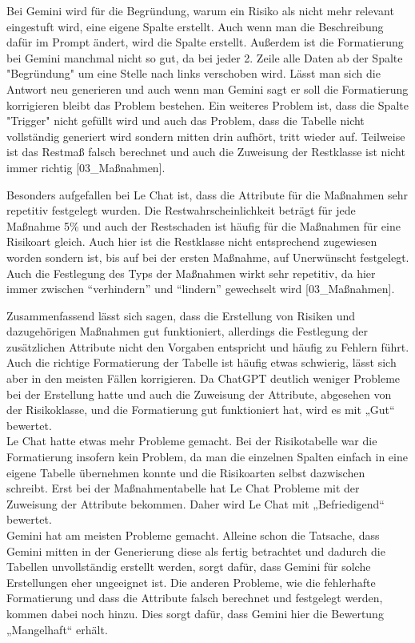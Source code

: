 Bei Gemini wird für die Begründung, warum ein Risiko als nicht mehr relevant eingestuft wird, eine eigene Spalte erstellt.
Auch wenn man die Beschreibung dafür im Prompt ändert, wird die Spalte erstellt. Außerdem ist die Formatierung bei Gemini
manchmal nicht so gut, da bei jeder 2. Zeile alle Daten ab der Spalte "Begründung" um eine Stelle nach links verschoben wird.
Lässt man sich die Antwort neu generieren und auch wenn man Gemini sagt er soll die Formatierung korrigieren bleibt das 
Problem bestehen. Ein weiteres Problem ist, dass die Spalte "Trigger" nicht gefüllt wird und auch das Problem, dass
die Tabelle nicht vollständig generiert wird sondern mitten drin aufhört, tritt wieder auf. Teilweise ist das Restmaß 
falsch berechnet und auch die Zuweisung der Restklasse ist nicht immer richtig [03\_Maßnahmen].

Besonders aufgefallen bei Le Chat ist, dass die Attribute für die Maßnahmen sehr repetitiv festgelegt wurden. Die Restwahrscheinlichkeit
beträgt für jede Maßnahme 5\% und auch der Restschaden ist häufig für die Maßnahmen für eine Risikoart gleich. Auch hier ist die 
Restklasse nicht entsprechend zugewiesen worden sondern ist, bis auf bei der ersten Maßnahme, auf Unerwünscht festgelegt. Auch 
die Festlegung des Typs der Maßnahmen wirkt sehr repetitiv, da hier immer zwischen ``verhindern'' und ``lindern'' gewechselt wird [03\_Maßnahmen].

Zusammenfassend lässt sich sagen, dass die Erstellung von Risiken und dazugehörigen Maßnahmen gut funktioniert, allerdings 
die Festlegung der zusätzlichen Attribute nicht den Vorgaben entspricht und häufig zu Fehlern führt. Auch die richtige 
Formatierung der Tabelle ist häufig etwas schwierig, lässt sich aber in den meisten Fällen korrigieren. Da ChatGPT deutlich 
weniger Probleme bei der Erstellung hatte und auch die Zuweisung der Attribute, abgesehen von der Risikoklasse, und die 
Formatierung gut funktioniert hat, wird es mit „Gut“ bewertet.\\
Le Chat hatte etwas mehr Probleme gemacht. Bei der Risikotabelle war die Formatierung insofern kein Problem, da man die 
einzelnen Spalten einfach in eine eigene Tabelle übernehmen konnte und die Risikoarten selbst dazwischen schreibt. Erst 
bei der Maßnahmentabelle hat Le Chat Probleme mit der Zuweisung der Attribute bekommen. Daher wird Le Chat mit 
„Befriedigend“ bewertet.\\
Gemini hat am meisten Probleme gemacht. Alleine schon die Tatsache, dass Gemini mitten in der Generierung diese als 
fertig betrachtet und dadurch die Tabellen unvollständig erstellt werden, sorgt dafür, dass Gemini für solche Erstellungen 
eher ungeeignet ist. Die anderen Probleme, wie die fehlerhafte Formatierung und dass die Attribute falsch berechnet und 
festgelegt werden, kommen dabei noch hinzu. Dies sorgt dafür, dass Gemini hier die Bewertung „Mangelhaft“ erhält.

